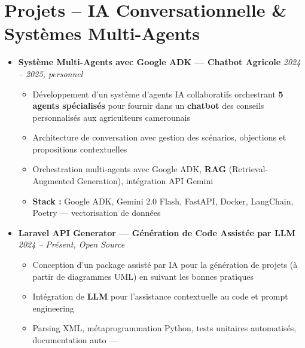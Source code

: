\documentclass[a4paper,11pt]{article}
\begin{document}
\section{Projets – IA Conversationnelle \& Systèmes Multi-Agents}
\begin{itemize}[leftmargin=*, label={}]

    \item \textbf{Système Multi-Agents avec Google ADK — Chatbot Agricole} \hfill \textit{2024 -- 2025, personnel}
    \vspace{-2pt}
    \begin{itemize}[leftmargin=0.4cm, nosep, label=\tiny$\bullet$]
        \item \small{Développement d'un système d'agents IA collaboratifs orchestrant \textbf{5 agents spécialisés} pour fournir dans un \textbf{chatbot} des conseils personnalisés aux agriculteurs camerounais}
        \item \small{Architecture de conversation avec gestion des scénarios, objections et propositions contextuelles}
        \item \small{Orchestration multi-agents avec Google ADK, \textbf{RAG} (Retrieval-Augmented Generation), intégration API Gemini}
        \item \small{\textbf{Stack :} Google ADK, Gemini 2.0 Flash, FastAPI, Docker, LangChain, Poetry — vectorisation de données}
    \end{itemize}
    \vspace{4pt}

    \item \textbf{Laravel API Generator — Génération de Code Assistée par LLM} \hfill \textit{2024 -- Présent, Open Source}
    \vspace{-2pt}
    \begin{itemize}[leftmargin=0.4cm, nosep, label=\tiny$\bullet$]
        \item \small{Conception d'un package assisté par IA pour la génération de projets (à partir de diagrammes UML) en suivant les bonnes pratiques}
        \item \small{Intégration de \textbf{LLM} pour l'assistance contextuelle au code et prompt engineering}
        \item \small{Parsing XML, métaprogrammation Python, tests unitaires automatisés, documentation auto — \href{https://github.com/Nameless0l}{\faGithub}}
    \end{itemize}
    \vspace{4pt}


\end{itemize}
\end{document}
